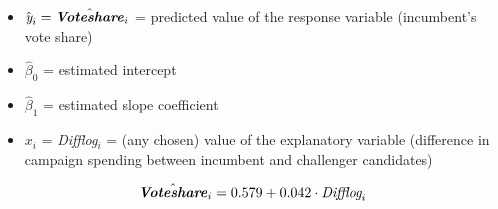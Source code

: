 \documentclass[12pt,letterpaper]{article}
\begin{document}
\begin{enumerate}
\begin{flushleft}
	
\begin{itemize}
	\item $\hat{\textit{y}}_i = \hat{\textbf{\textit{Voteshare}}}_i$ = predicted value of the response variable (incumbent's vote share)
	\item $\hat{\beta}_0$ = estimated intercept
	\item $\hat{\beta}_1$ = estimated slope coefficient
	\item $x_i$ = \textit{Difflog}\(_i\) = (any chosen) value of the explanatory variable (difference in campaign spending between incumbent and challenger candidates)
\end{itemize}

	
\end{flushleft}
		\[\hat{\textbf{\textit{Voteshare}}}_i  =  0.579 + 0.042 \cdot  \textit{Difflog}_i
	\]

	\end{enumerate}
\end{document}
